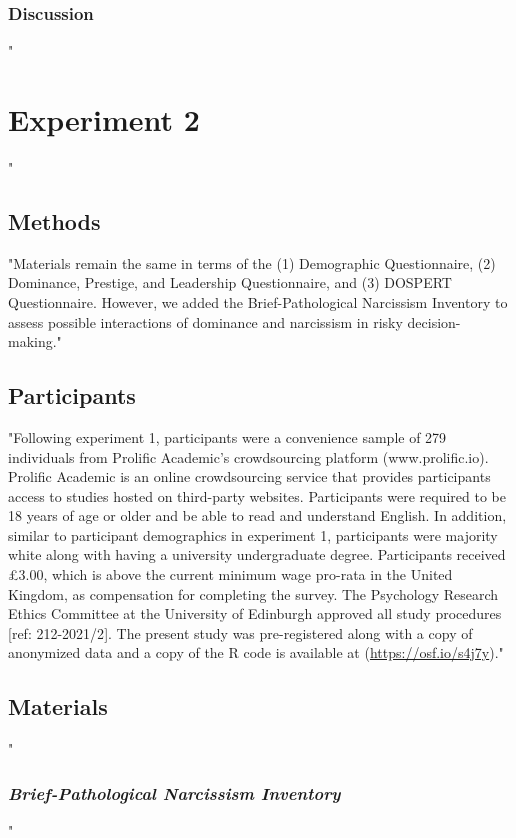 \documentclass[
"  donotrepeattitle,doc, 12pt, a4paper,floatsintext]{apa7}"
\begin{document}
\hypertarget{discussion}{%
\subsubsection{Discussion}\label{discussion}}
\hypertarget{experiment-2}{%
"\section{Experiment 2}\label{experiment-2}}"
\hypertarget{methods-1}{%
\subsection{Methods}\label{methods-1}}
"Materials remain the same in terms of the (1) Demographic Questionnaire, (2) Dominance, Prestige, and Leadership Questionnaire, and (3) DOSPERT Questionnaire. However, we added the Brief-Pathological Narcissism Inventory to assess possible interactions of dominance and narcissism in risky decision-making."
\hypertarget{participants}{%
\subsection{Participants}\label{participants}}
"Following experiment 1, participants were a convenience sample of 279 individuals from Prolific Academic's crowdsourcing platform (www.prolific.io). Prolific Academic is an online crowdsourcing service that provides participants access to studies hosted on third-party websites. Participants were required to be 18 years of age or older and be able to read and understand English. In addition, similar to participant demographics in experiment 1, participants were majority white along with having a university undergraduate degree. Participants received £3.00, which is above the current minimum wage pro-rata in the United Kingdom, as compensation for completing the survey. The Psychology Research Ethics Committee at the University of Edinburgh approved all study procedures {[}ref: 212-2021/2{]}. The present study was pre-registered along with a copy of anonymized data and a copy of the R code is available at (\url{https://osf.io/s4j7y})."
\hypertarget{materials-1}{%
\subsection{Materials}\label{materials-1}}
\hypertarget{brief-pathological-narcissism-inventory}{%
"\subsubsection{\texorpdfstring{\emph{Brief-Pathological Narcissism Inventory}}{Brief-Pathological Narcissism Inventory}}\label{brief-pathological-narcissism-inventory}}"
\end{document}

